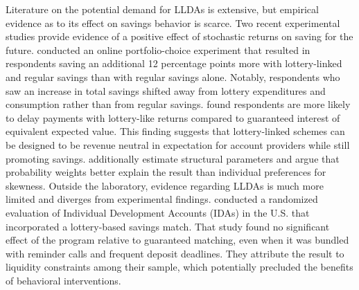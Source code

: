 \documentclass[11pt]{article}
\begin{document}

	Literature on the potential demand for LLDAs is extensive, but empirical evidence as to its effect on savings behavior is scarce. Two recent experimental studies provide evidence of a positive effect of stochastic returns on saving for the future.  conducted an online portfolio-choice experiment that resulted in respondents saving an additional 12 percentage points more with lottery-linked and regular savings than with regular savings alone. Notably, respondents who saw an increase in total savings shifted away from lottery expenditures and consumption rather than from regular savings.  found respondents are more likely to delay payments with lottery-like returns compared to guaranteed interest of equivalent expected value. This finding suggests that lottery-linked schemes can be designed to be revenue neutral in expectation for account providers while still promoting savings.  additionally estimate structural parameters and argue that probability weights better explain the result than individual preferences for skewness. Outside the laboratory, evidence regarding LLDAs is much more limited and diverges from experimental findings.  conducted a randomized evaluation of Individual Development Accounts (IDAs) in the U.S. that incorporated a lottery-based savings match. That study found no significant effect of the program relative to guaranteed matching, even when it was bundled with reminder calls and frequent deposit deadlines. They attribute the result to liquidity constraints among their sample, which potentially precluded the benefits of behavioral interventions.
\end{document}
